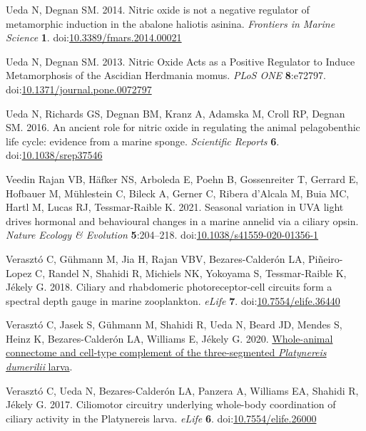 \documentclass[
  10pt,
  onecolumn]{article}
\newlength{\cslhangindent}
\newlength{\cslentryspacingunit} %
\newenvironment{CSLReferences}[2] %
 {%
  \setlength{\parindent}{0pt}
  \ifodd #1
  \let\oldpar\par
  \def\par{\hangindent=\cslhangindent\oldpar}
  \fi
  \setlength{\parskip}{#2\cslentryspacingunit}
 }%
 {}
\begin{document}
\begin{CSLReferences}{1}{0}
\leavevmode{}%
Ueda N, Degnan SM. 2014. Nitric oxide is not a negative regulator of
metamorphic induction in the abalone haliotis asinina. \emph{Frontiers
in Marine Science} \textbf{1}.
doi:\href{https://doi.org/10.3389/fmars.2014.00021}{10.3389/fmars.2014.00021}

\leavevmode{}%
Ueda N, Degnan SM. 2013. Nitric Oxide Acts as a Positive Regulator to
Induce Metamorphosis of the Ascidian Herdmania momus. \emph{PLoS ONE}
\textbf{8}:e72797.
doi:\href{https://doi.org/10.1371/journal.pone.0072797}{10.1371/journal.pone.0072797}

\leavevmode{}%
Ueda N, Richards GS, Degnan BM, Kranz A, Adamska M, Croll RP, Degnan SM.
2016. An ancient role for nitric oxide in regulating the animal
pelagobenthic life cycle: evidence from a marine sponge.
\emph{Scientific Reports} \textbf{6}.
doi:\href{https://doi.org/10.1038/srep37546}{10.1038/srep37546}

\leavevmode{}%
Veedin Rajan VB, Häfker NS, Arboleda E, Poehn B, Gossenreiter T, Gerrard
E, Hofbauer M, Mühlestein C, Bileck A, Gerner C, Ribera d'Alcala M, Buia
MC, Hartl M, Lucas RJ, Tessmar-Raible K. 2021. Seasonal variation in UVA
light drives hormonal and behavioural changes in a marine annelid via a
ciliary opsin. \emph{Nature Ecology \& Evolution} \textbf{5}:204--218.
doi:\href{https://doi.org/10.1038/s41559-020-01356-1}{10.1038/s41559-020-01356-1}

\leavevmode{}%
Verasztó C, Gühmann M, Jia H, Rajan VBV, Bezares-Calderón LA,
Piñeiro-Lopez C, Randel N, Shahidi R, Michiels NK, Yokoyama S,
Tessmar-Raible K, Jékely G. 2018. Ciliary and rhabdomeric
photoreceptor-cell circuits form a spectral depth gauge in marine
zooplankton. \emph{eLife} \textbf{7}.
doi:\href{https://doi.org/10.7554/elife.36440}{10.7554/elife.36440}

\leavevmode{}%
Verasztó C, Jasek S, Gühmann M, Shahidi R, Ueda N, Beard JD, Mendes S,
Heinz K, Bezares-Calderón LA, Williams E, Jékely G. 2020.
\href{http://dx.doi.org/10.1101/2020.08.21.260984}{Whole-animal
connectome and cell-type complement of the three-segmented
{\emph{Platynereis dumerilii}} larva}.

\leavevmode{}%
Verasztó C, Ueda N, Bezares-Calderón LA, Panzera A, Williams EA, Shahidi
R, Jékely G. 2017. Ciliomotor circuitry underlying whole-body
coordination of ciliary activity in the Platynereis larva. \emph{eLife}
\textbf{6}.
doi:\href{https://doi.org/10.7554/elife.26000}{10.7554/elife.26000}


\end{CSLReferences}
\end{document}
